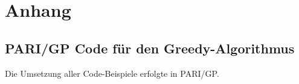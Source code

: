\section{Anhang}
\subsection{PARI/GP Code für den Greedy-Algorithmus}\label{code:greedy}
Die Umsetzung aller Code-Beispiele erfolgte in PARI/GP. \cite{PARI2018}

